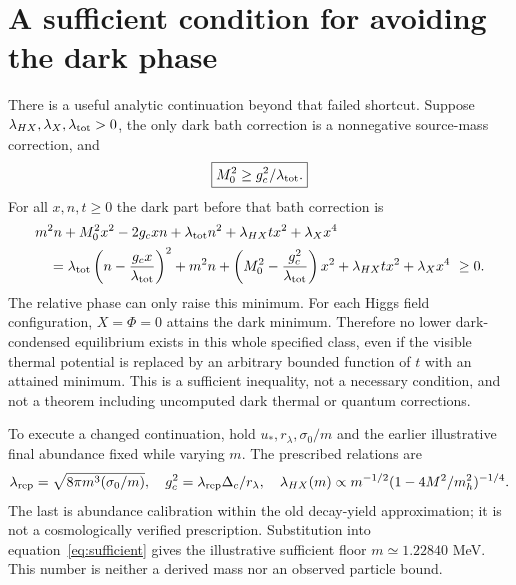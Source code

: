 \documentclass[11pt]{article}
\newcommand{\lp}{\lambda_{HX}}
\newcommand{\lt}{\lambda_{\rm tot}}
\begin{document}
\section{A sufficient condition for avoiding the dark phase}
There is a useful analytic continuation beyond that failed shortcut.
Suppose $\lp,\lambda_X,\lt>0$, the only dark bath correction is a
nonnegative source-mass correction, and
\begin{equation}
 \boxed{M_0^2\ge g_c^2/\lt.}
\label{eq:sufficient}
\end{equation}
For all $x,n,t\ge0$ the dark part before that bath correction is
\begin{align}
 &m^2n+M_0^2x^2-2g_cxn+\lt n^2+\lp tx^2+\lambda_Xx^4\\
 &\quad=\lt\left(n-\frac{g_cx}{\lt}\right)^2
 +m^2n+\left(M_0^2-\frac{g_c^2}{\lt}\right)x^2
 +\lp tx^2+\lambda_Xx^4\ \ge0.\nonumber
\end{align}
The relative phase can only raise this minimum. For each Higgs field
configuration, $X=\Phi=0$ attains the dark minimum. Therefore no lower
dark-condensed equilibrium exists in this whole specified class, even if
the visible thermal potential is replaced by an arbitrary bounded function
of $t$ with an attained minimum. This is a sufficient inequality, not a
necessary condition, and not a theorem including uncomputed dark thermal
or quantum corrections.

To execute a changed continuation, hold $u_*,r_\lambda,\sigma_0/m$ and the
earlier illustrative final abundance fixed while varying $m$. The prescribed
relations are
\begin{equation}
 \lambda_{\rm rep}=\sqrt{8\pi m^3(\sigma_0/m)},\quad
 g_c^2=\lambda_{\rm rep}\Delta_c/r_\lambda,\quad
 \lp(m)\propto m^{-1/2}(1-4M^2/m_h^2)^{-1/4}.
\end{equation}
The last is abundance calibration within the old decay-yield approximation;
it is not a cosmologically verified prescription. Substitution into
equation~\eqref{eq:sufficient} gives the illustrative sufficient floor
$m\simeq1.22840$ MeV. This number is neither a derived mass nor an observed
particle bound.
\end{document}
